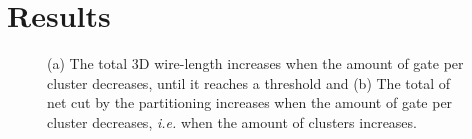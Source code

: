 \documentclass[conference]{IEEEtran}
\begin{document}
\section{Results}\label{sec:res}




\begin{figure}
  \centering
  \hfill
  \caption{(a) The total 3D wire-length increases when the amount of gate per cluster decreases, until it reaches a threshold and (b) The total of net cut by the partitioning increases when the amount of gate per cluster decreases, \textit{i.e.} when the amount of clusters increases.}
  \label{fig:3Dnets}
\end{figure} 
\end{document}
